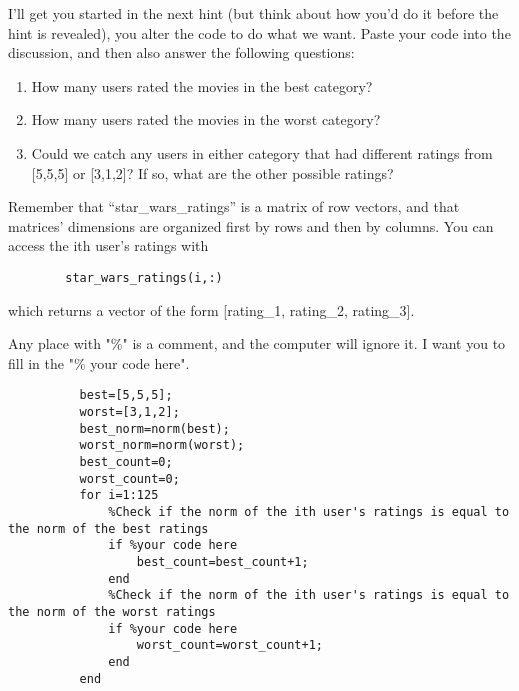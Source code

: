 \documentclass{ximera}
\begin{document}
\begin{exploration}
    I'll get you started in the next hint (but think about how you'd do it before the hint is revealed), you alter the code to do what we want. Paste your code into the discussion, and then also answer the following questions:

    \begin{enumerate}

      \item How many users rated the movies in the best category?
      \item How many users rated the movies in the worst category?
      \item Could we catch any users in either category that had different ratings from [5,5,5] or [3,1,2]? If so, what are the other possible ratings?
      
    \end{enumerate}

    \begin{remark}

      Remember that ``star\_wars\_ratings'' is a matrix of row vectors, and that matrices' dimensions are organized first by rows and then by columns. You can access the ith user's ratings with 
      \begin{verbatim}
        star_wars_ratings(i,:)
      \end{verbatim}
      
      which returns a vector of the form [rating\_1, rating\_2, rating\_3].

    \end{remark}

      Any place with "\%" is a comment, and the computer will ignore it. I want you to fill in the "\% your code here".

      \begin{verbatim}
          best=[5,5,5];
          worst=[3,1,2];
          best_norm=norm(best);
          worst_norm=norm(worst);
          best_count=0;
          worst_count=0;
          for i=1:125
              %Check if the norm of the ith user's ratings is equal to the norm of the best ratings
              if %your code here
                  best_count=best_count+1;
              end
              %Check if the norm of the ith user's ratings is equal to the norm of the worst ratings
              if %your code here
                  worst_count=worst_count+1;
              end
          end
      \end{verbatim}
  \end{exploration}
\end{document}
